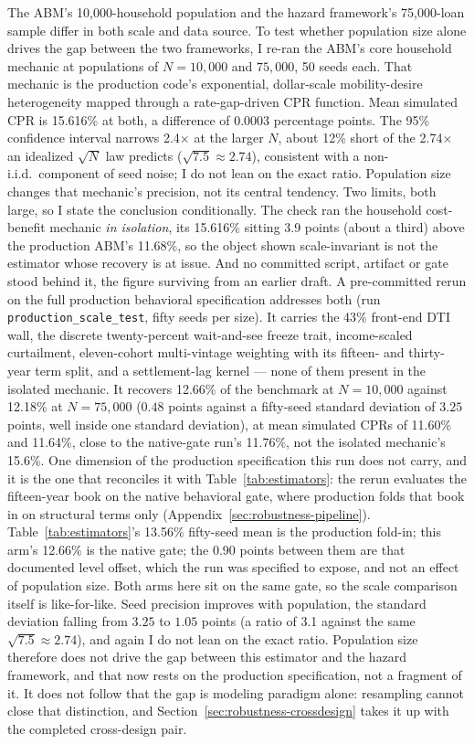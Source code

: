 \documentclass[12pt]{article}
\begin{document}
The ABM's 10,000-household population and the hazard framework's 75,000-loan sample differ in both scale and data source. To test whether population size alone drives the gap between the two frameworks, I re-ran the ABM's core household mechanic at populations of $N = 10{,}000$ and $75{,}000$, 50 seeds each. That mechanic is the production code's exponential, dollar-scale mobility-desire heterogeneity mapped through a rate-gap-driven CPR function. Mean simulated CPR is 15.616\% at both, a difference of 0.0003 percentage points. The 95\% confidence interval narrows 2.4$\times$ at the larger $N$, about 12\% short of the 2.74$\times$ an idealized $\sqrt{N}$ law predicts ($\sqrt{7.5} \approx 2.74$), consistent with a non-i.i.d.\ component of seed noise; I do not lean on the exact ratio. Population size changes that mechanic's precision, not its central tendency. Two limits, both large, so I state the conclusion conditionally. The check ran the household cost-benefit mechanic \emph{in isolation}, its 15.616\% sitting 3.9 points (about a third) above the production ABM's 11.68\%, so the object shown scale-invariant is not the estimator whose recovery is at issue. And no committed script, artifact or gate stood behind it, the figure surviving from an earlier draft. A pre-committed rerun on the full production behavioral specification addresses both (run \texttt{production\_scale\_test}, fifty seeds per size). It carries the 43\% front-end DTI wall, the discrete twenty-percent wait-and-see freeze trait, income-scaled curtailment, eleven-cohort multi-vintage weighting with its fifteen- and thirty-year term split, and a settlement-lag kernel --- none of them present in the isolated mechanic. It recovers 12.66\% of the benchmark at $N = 10{,}000$ against 12.18\% at $N = 75{,}000$ ($0.48$ points against a fifty-seed standard deviation of $3.25$ points, well inside one standard deviation), at mean simulated CPRs of 11.60\% and 11.64\%, close to the native-gate run's 11.76\%, not the isolated mechanic's 15.6\%. One dimension of the production specification this run does not carry, and it is the one that reconciles it with Table~\ref{tab:estimators}: the rerun evaluates the fifteen-year book on the native behavioral gate, where production folds that book in on structural terms only (Appendix~\ref{sec:robustness-pipeline}). Table~\ref{tab:estimators}'s 13.56\% fifty-seed mean is the production fold-in; this arm's 12.66\% is the native gate; the 0.90 points between them are that documented level offset, which the run was specified to expose, and not an effect of population size. Both arms here sit on the same gate, so the scale comparison itself is like-for-like. Seed precision improves with population, the standard deviation falling from $3.25$ to $1.05$ points (a ratio of 3.1 against the same $\sqrt{7.5} \approx 2.74$), and again I do not lean on the exact ratio. Population size therefore does not drive the gap between this estimator and the hazard framework, and that now rests on the production specification, not a fragment of it. It does not follow that the gap is modeling paradigm alone: resampling cannot close that distinction, and Section~\ref{sec:robustness-crossdesign} takes it up with the completed cross-design pair.
\end{document}
